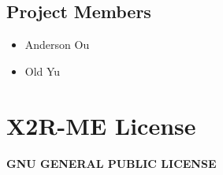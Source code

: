 \documentclass[letterpaper,10pt,english]{sphinxmanual}
\begin{document}
\section{Project Members}
\label{license:project-members}\begin{itemize}
\item {} 
Anderson Ou

\item {} 
Old Yu

\end{itemize}


\chapter{X2R-ME License}
\label{license:x2r-license}\label{license:x2r-me-license}
\textbf{GNU GENERAL PUBLIC LICENSE}
\end{document}
